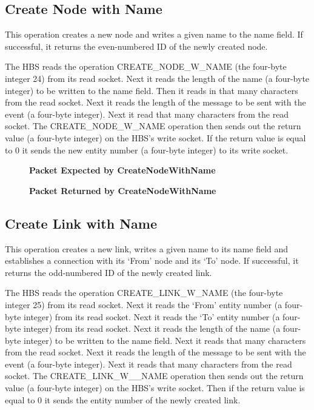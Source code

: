 \subsection{Create Node with Name}

This operation creates a new node and writes a given name to the name
field.  If successful, it returns the even-numbered ID of the newly
created node.  

The HBS reads the operation CREATE\_NODE\_W\_NAME (the four-byte integer
24) from its read socket. Next it reads the length of the name (a four-byte
integer) to be written to the name field.  Then it reads in that many
characters from the read socket.  Next it reads the length of the
message to be sent with the event (a four-byte integer).  Next it read that
many characters from the read socket.  The CREATE\_NODE\_W\_NAME
operation then sends out the return value (a four-byte integer) on the
HBS's write socket.  If the return value is equal to 0 it sends the new
entity number (a four-byte integer) to its write socket.

\begin{figure}[htb]
  \centerline{}
  \caption{{\bf Packet Expected by CreateNodeWithName}}
  \label{fig:CreateNodeWithName1}
\end{figure}

\begin{figure}[htb]
  \centerline{}
  \caption{{\bf Packet Returned by CreateNodeWithName}}
  \label{fig:CreateNodeWithName2}
\end{figure}


\newpage
\subsection{Create Link with Name}

This operation creates a new link, writes a given name to its name field
and establishes a connection with its `From' node and its `To' node.  If
successful, it returns the odd-numbered ID of the newly created link.  

The HBS reads the operation CREATE\_LINK\_W\_NAME (the four-byte integer
25) from its read socket.  Next it reads the `From' entity number (a
four-byte integer) from its read socket.  Next it reads the `To' entity
number (a four-byte integer) from its read socket. Next it reads the length
of the name (a four-byte integer) to be written to the name field.  Next it
reads that many characters from the read socket.  Next it reads the
length of the message to be sent with the event (a four-byte integer).
Next it reads that many characters from the read socket.  The
CREATE\_LINK\_W\_\_NAME operation then sends out the return value (a
four-byte integer) on the HBS's write socket.  Then if the return value is
equal to 0 it sends the entity number of the newly created link.

